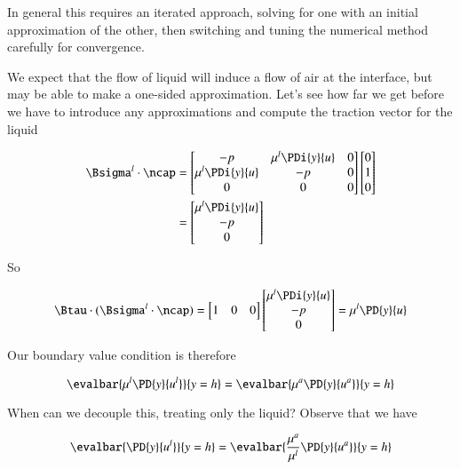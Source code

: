 In general this requires an iterated approach, solving for one with an initial approximation of the other, then switching and tuning the numerical method carefully for convergence.

We expect that the flow of liquid will induce a flow of air at the interface, but may be able to make a one-sided approximation.  Let's see how far we get before we have to introduce any approximations and compute the traction vector for the liquid

\begin{align*}
\Bsigma^l \cdot \ncap &=
\begin{bmatrix}
-p & \mu^l \PDi{y}{u} & 0 \\
\mu^l \PDi{y}{u} & -p & 0 \\
0 & 0 & 0
\end{bmatrix}
\begin{bmatrix}
0 \\
1 \\
0
\end{bmatrix} \\
&=
\begin{bmatrix}
\mu^l \PDi{y}{u} \\
-p \\
0
\end{bmatrix}
\end{align*}

So

\begin{equation}\label{eqn:continuumL12:230}
\Btau \cdot (\Bsigma^l \cdot \ncap)
=
\begin{bmatrix}
1 & 0 & 0
\end{bmatrix}
\begin{bmatrix}
\mu^l \PDi{y}{u} \\
-p \\
0
\end{bmatrix}
=
\mu^l \PD{y}{u}
\end{equation}

Our boundary value condition is therefore

\begin{equation}\label{eqn:continuumL12:250}
\evalbar{\mu^l \PD{y}{u^l}}{y = h} =
\evalbar{\mu^a \PD{y}{u^a}}{y = h}
\end{equation}

When can we decouple this, treating only the liquid?  Observe that we have

\begin{equation}\label{eqn:continuumL12:270}
\evalbar{\PD{y}{u^l}}{y = h} =
\evalbar{\frac{\mu^a}{\mu^l} \PD{y}{u^a}}{y = h}
\end{equation}

